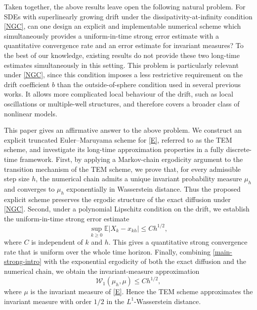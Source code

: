 \documentclass[aap]{imsart}
\theoremstyle{plain}
\theoremstyle{definition}
\begin{document}
Taken together, the above results leave open the following natural problem. For SDEs with superlinearly growing drift under the dissipativity-at-infinity condition \eqref{NGC}, can one design an explicit and implementable numerical scheme which simultaneously provides a uniform-in-time strong error estimate with a quantitative convergence rate and an error estimate for invariant measures? To the best of our knowledge, existing results do not provide these two long-time estimates simultaneously in this setting. This problem is particularly relevant under \eqref{NGC}, since this condition imposes a less restrictive requirement on the drift coefficient \(b\) than the outside-of-sphere condition used in several previous works. It allows more complicated local behaviour of the drift, such as local oscillations or multiple-well structures, and therefore covers a broader class of nonlinear models.

This paper gives an affirmative answer to the above problem. We construct an explicit truncated Euler--Maruyama scheme for \eqref{E}, referred to as the TEM scheme, and investigate its long-time approximation properties in a fully discrete-time framework. First, by applying a Markov-chain ergodicity argument to the transition mechanism of the TEM scheme, we prove that, for every admissible step size \(h\), the numerical chain admits a unique invariant probability measure \(\mu_h\) and converges to \(\mu_h\) exponentially in Wasserstein distance. Thus the proposed explicit scheme preserves the ergodic structure of the exact diffusion under \eqref{NGC}. Second, under a polynomial Lipschitz condition on the drift, we establish the uniform-in-time strong error estimate
\begin{equation}\label{main-strong-intro}
	\sup_{k\geqslant 0}\mathbb E|X_k-x_{kh}|\leqslant C h^{1/2},
\end{equation}
where \(C\) is independent of \(k\) and \(h\). This gives a quantitative strong convergence rate that is uniform over the whole time horizon. Finally, combining \eqref{main-strong-intro} with the exponential ergodicity of both the exact diffusion and the numerical chain, we obtain the invariant-measure approximation
\begin{equation}\label{main-invariant-intro}
	\mathcal W_1(\mu_h,\mu)\leqslant C h^{1/2},
\end{equation}
where \(\mu\) is the invariant measure of \eqref{E}. Hence the TEM scheme approximates the invariant measure with order \(1/2\) in the \(L^1\)-Wasserstein distance.
\end{document}
